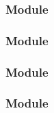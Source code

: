 \documentclass[t]{beamer}
\begin{document}
\begin{frame}
\frametitle{Module}


\end{frame}

\begin{frame}
\frametitle{Module}


\end{frame}

\begin{frame}
\frametitle{Module}


\end{frame}

\begin{frame}
\frametitle{Module}


\end{frame}
\end{document}
